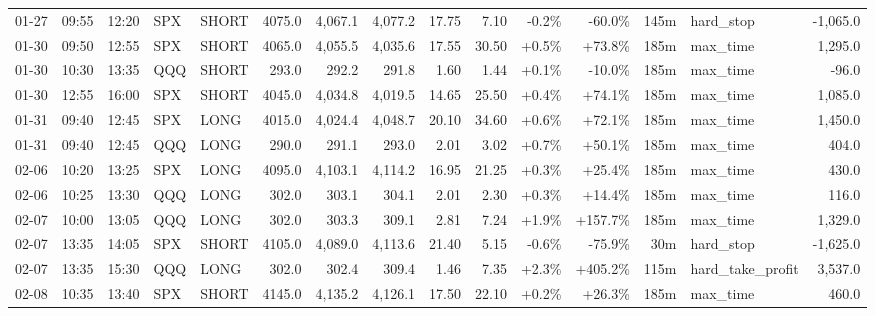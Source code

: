 \documentclass[11pt,a4paper,twoside]{article}
\begin{document}
\begin{landscape}
\begin{center}
\begin{longtable}{>{\color{txtmain}}l l l l l r r r r r r r r >{\color{txtmain}}l r}
01-27 & 09:55 & 12:20 & SPX & SHORT & 4075.0 & 4,067.1 & 4,077.2 & 17.75 & 7.10 & \textcolor{lossred}{-0.2\%} & \textcolor{lossred}{-60.0\%} & 145m & hard\_stop & \textcolor{lossred}{-1,065.0} \\
01-30 & 09:50 & 12:55 & SPX & SHORT & 4065.0 & 4,055.5 & 4,035.6 & 17.55 & 30.50 & \textcolor{wingreen}{+0.5\%} & \textcolor{wingreen}{+73.8\%} & 185m & max\_time & \textcolor{wingreen}{1,295.0} \\
01-30 & 10:30 & 13:35 & QQQ & SHORT & 293.0 & 292.2 & 291.8 & 1.60 & 1.44 & \textcolor{wingreen}{+0.1\%} & \textcolor{lossred}{-10.0\%} & 185m & max\_time & \textcolor{lossred}{-96.0} \\
01-30 & 12:55 & 16:00 & SPX & SHORT & 4045.0 & 4,034.8 & 4,019.5 & 14.65 & 25.50 & \textcolor{wingreen}{+0.4\%} & \textcolor{wingreen}{+74.1\%} & 185m & max\_time & \textcolor{wingreen}{1,085.0} \\
01-31 & 09:40 & 12:45 & SPX & LONG & 4015.0 & 4,024.4 & 4,048.7 & 20.10 & 34.60 & \textcolor{wingreen}{+0.6\%} & \textcolor{wingreen}{+72.1\%} & 185m & max\_time & \textcolor{wingreen}{1,450.0} \\
01-31 & 09:40 & 12:45 & QQQ & LONG & 290.0 & 291.1 & 293.0 & 2.01 & 3.02 & \textcolor{wingreen}{+0.7\%} & \textcolor{wingreen}{+50.1\%} & 185m & max\_time & \textcolor{wingreen}{404.0} \\
02-06 & 10:20 & 13:25 & SPX & LONG & 4095.0 & 4,103.1 & 4,114.2 & 16.95 & 21.25 & \textcolor{wingreen}{+0.3\%} & \textcolor{wingreen}{+25.4\%} & 185m & max\_time & \textcolor{wingreen}{430.0} \\
02-06 & 10:25 & 13:30 & QQQ & LONG & 302.0 & 303.1 & 304.1 & 2.01 & 2.30 & \textcolor{wingreen}{+0.3\%} & \textcolor{wingreen}{+14.4\%} & 185m & max\_time & \textcolor{wingreen}{116.0} \\
02-07 & 10:00 & 13:05 & QQQ & LONG & 302.0 & 303.3 & 309.1 & 2.81 & 7.24 & \textcolor{wingreen}{+1.9\%} & \textcolor{wingreen}{+157.7\%} & 185m & max\_time & \textcolor{wingreen}{1,329.0} \\
02-07 & 13:35 & 14:05 & SPX & SHORT & 4105.0 & 4,089.0 & 4,113.6 & 21.40 & 5.15 & \textcolor{lossred}{-0.6\%} & \textcolor{lossred}{-75.9\%} & 30m & hard\_stop & \textcolor{lossred}{-1,625.0} \\
02-07 & 13:35 & 15:30 & QQQ & LONG & 302.0 & 302.4 & 309.4 & 1.46 & 7.35 & \textcolor{wingreen}{+2.3\%} & \textcolor{wingreen}{+405.2\%} & 115m & hard\_take\_profit & \textcolor{wingreen}{3,537.0} \\
02-08 & 10:35 & 13:40 & SPX & SHORT & 4145.0 & 4,135.2 & 4,126.1 & 17.50 & 22.10 & \textcolor{wingreen}{+0.2\%} & \textcolor{wingreen}{+26.3\%} & 185m & max\_time & \textcolor{wingreen}{460.0} \\

\end{longtable}
\end{center}
\end{landscape}
\end{document}
